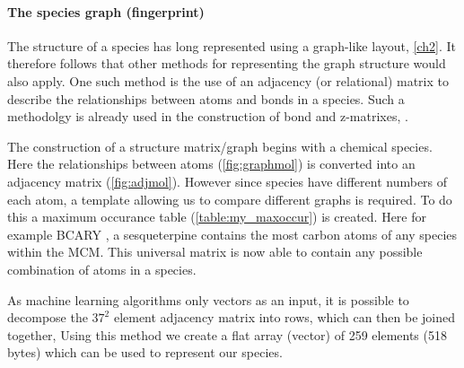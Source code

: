 \paragraph{The species graph (fingerprint)}\label{sec:specgraph}

The structure of a species has long represented using a graph-like layout, \autoref{ch2}. It therefore follows that other methods for representing the graph structure would also apply. One such method is the use of an adjacency (or relational) matrix to describe the relationships between atoms and bonds in a species. Such a methodolgy is already used in the construction of bond and z-matrixes, \citep{mcmgen,zmatrix}. 

The construction of a structure matrix/graph begins with a chemical species. Here the relationships between atoms (\autoref{fig:graphmol}) is converted into an adjacency matrix (\autoref{fig:adjmol}). However since species have different numbers of each atom, a template allowing us to compare different graphs is required. To do this a maximum occurance table (\autoref{table:my_maxoccur}) is created. Here for example BCARY , a sesqueterpine contains the most carbon atoms of any species within the MCM. This universal matrix is now able to contain any possible combination of atoms in a species. 

As machine learning algorithms only vectors as an input, it is possible to decompose the $37^2$ element adjacency matrix into rows, which can then be joined together, Using this method we create a flat array (vector) of 259 elements (518 bytes) which can be used to represent our species.


